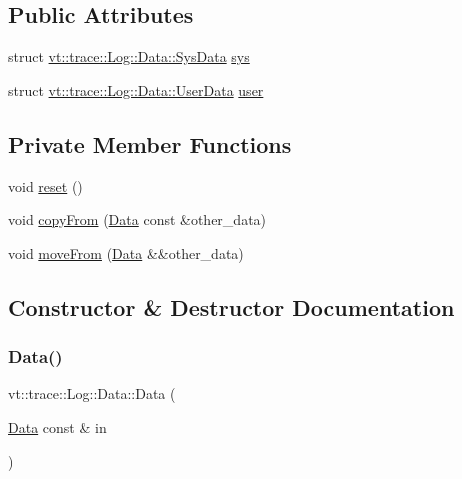 \subsection*{Public Attributes}
\begin{DoxyCompactItemize}
\item 
struct \hyperlink{structvt_1_1trace_1_1_log_1_1_data_1_1_sys_data}{vt\+::trace\+::\+Log\+::\+Data\+::\+Sys\+Data} \hyperlink{unionvt_1_1trace_1_1_log_1_1_data_a71322b10139cee6014cd6be83c99b3d9}{sys}
\item 
struct \hyperlink{structvt_1_1trace_1_1_log_1_1_data_1_1_user_data}{vt\+::trace\+::\+Log\+::\+Data\+::\+User\+Data} \hyperlink{unionvt_1_1trace_1_1_log_1_1_data_a8d893c0de3ee2fca0852607fa908a2e6}{user}
\end{DoxyCompactItemize}
\subsection*{Private Member Functions}
\begin{DoxyCompactItemize}
\item 
void \hyperlink{unionvt_1_1trace_1_1_log_1_1_data_a12624c14a201c5d045ad136a20548f72}{reset} ()
\item 
void \hyperlink{unionvt_1_1trace_1_1_log_1_1_data_a83680caa8429da52cb5e6ded2c43f5d5}{copy\+From} (\hyperlink{unionvt_1_1trace_1_1_log_1_1_data}{Data} const \&other\+\_\+data)
\item 
void \hyperlink{unionvt_1_1trace_1_1_log_1_1_data_a964f30e8a416019ca364df82bae12f0a}{move\+From} (\hyperlink{unionvt_1_1trace_1_1_log_1_1_data}{Data} \&\&other\+\_\+data)
\end{DoxyCompactItemize}


\subsection{Constructor \& Destructor Documentation}
\mbox{\label{unionvt_1_1trace_1_1_log_1_1_data_aa391f018a8b00d5d9d5083ff3f846fcd}} 
\subsubsection{\texorpdfstring{Data()}{Data()}\hspace{0.1cm}{\footnotesize\ttfamily [1/4]}}
{\footnotesize\ttfamily vt\+::trace\+::\+Log\+::\+Data\+::\+Data (\begin{DoxyParamCaption}\item[{\hyperlink{unionvt_1_1trace_1_1_log_1_1_data}{Data} const \&}]{in }\end{DoxyParamCaption})\hspace{0.3cm}{\ttfamily [inline]}}

